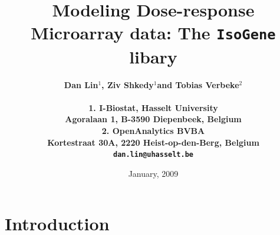 \documentclass[10pt]{article}
\newcommand{\markchapter}[1]{\markboth{
   \mbox{}\hfill {\it Chapter \thechapter}. \ {\it #1}  \hfill  \mbox{}\hspace{-\textwidth} \protect\rule[-2mm]{\textwidth}{.15mm}}{}}
\begin{document}

\title{
{\LARGE \bf
Modeling Dose-response Microarray data: The \texttt{IsoGene} libary\\[2cm]}}

\author{\large \bf Dan Lin$^1$, Ziv Shkedy$^1$and Tobias Verbeke$^2$  \\[2cm]\\
  1. I-Biostat, Hasselt University\\
  Agoralaan 1, B-3590 Diepenbeek, Belgium\\
  2. OpenAnalytics BVBA\\
  Kortestraat 30A, 2220 Heist-op-den-Berg, Belgium\\[2cm]
  \texttt{dan.lin@uhasselt.be}\\[2cm]
}

\date{January, 2009}
\maketitle
\clearpage\thispagestyle{empty}
\mbox{}

\newpage\thispagestyle{empty}
%

%

%


\tableofcontents


{}




\section{Introduction}
\end{document}
